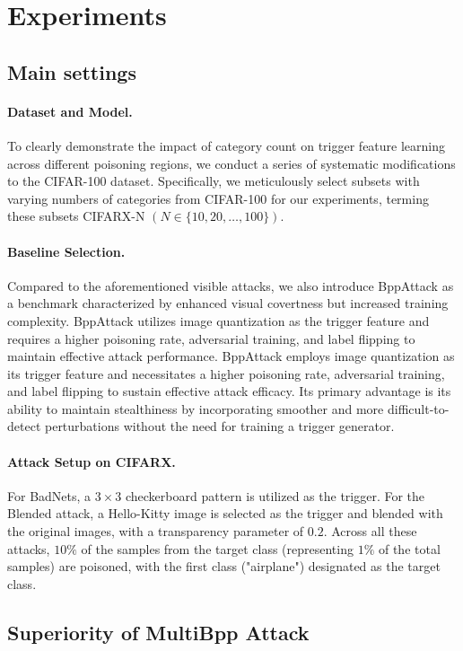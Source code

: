 \documentclass{article}
\begin{document}
\section{Experiments}
\subsection{Main settings}
\paragraph{Dataset and Model.}
 To clearly demonstrate the impact of category count on trigger feature learning across different poisoning regions, we conduct a series of systematic modifications to the CIFAR-100 dataset. Specifically, we meticulously select subsets with varying numbers of categories from CIFAR-100 for our experiments, terming these subsets CIFARX-N \((N\in\{10,20,\dots,100\})\).
\paragraph{Baseline Selection.}
 Compared to the aforementioned visible attacks, we also introduce BppAttack as a benchmark characterized by enhanced visual covertness but increased training complexity. BppAttack utilizes image quantization as the trigger feature and requires a higher poisoning rate, adversarial training, and label flipping to maintain effective attack performance. BppAttack employs image quantization as its trigger feature and necessitates a higher poisoning rate, adversarial training, and label flipping to sustain effective attack efficacy. Its primary advantage is its ability to maintain stealthiness by incorporating smoother and more difficult-to-detect perturbations without the need for training a trigger generator.

\paragraph{Attack Setup on CIFARX.}
For BadNets, a \(3 × 3\) checkerboard pattern is utilized as the trigger. For the Blended attack, a Hello-Kitty image is selected as the trigger and blended with the original images, with a transparency parameter of \(0.2\). Across all these attacks, \(10\%\) of the samples from the target class (representing \(1\%\) of the total samples) are poisoned, with the first class ("airplane") designated as the target class.

\subsection{Superiority of MultiBpp Attack}
\end{document}
